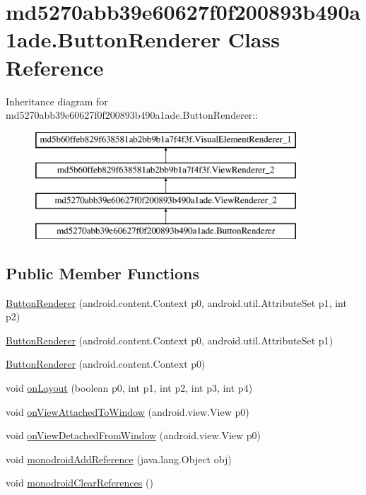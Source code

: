 \hypertarget{classmd5270abb39e60627f0f200893b490a1ade_1_1_button_renderer}{
\section{md5270abb39e60627f0f200893b490a1ade.ButtonRenderer Class Reference}
\label{classmd5270abb39e60627f0f200893b490a1ade_1_1_button_renderer}
}
Inheritance diagram for md5270abb39e60627f0f200893b490a1ade.ButtonRenderer::\begin{figure}[H]
\begin{center}
\leavevmode
\includegraphics[height=4cm]{classmd5270abb39e60627f0f200893b490a1ade_1_1_button_renderer}
\end{center}
\end{figure}
\subsection*{Public Member Functions}
\begin{CompactItemize}
\item 
\hyperlink{classmd5270abb39e60627f0f200893b490a1ade_1_1_button_renderer_69de53fe1b8c1bd7f640db6eef322fdd}{ButtonRenderer} (android.content.Context p0, android.util.AttributeSet p1, int p2)
\item 
\hyperlink{classmd5270abb39e60627f0f200893b490a1ade_1_1_button_renderer_032b2a49be9b19da3e846d539da04e80}{ButtonRenderer} (android.content.Context p0, android.util.AttributeSet p1)
\item 
\hyperlink{classmd5270abb39e60627f0f200893b490a1ade_1_1_button_renderer_ca79f33076eb791b82fb74d4075b5805}{ButtonRenderer} (android.content.Context p0)
\item 
void \hyperlink{classmd5270abb39e60627f0f200893b490a1ade_1_1_button_renderer_f2e3875cd2b7a03f7278f91e55939532}{onLayout} (boolean p0, int p1, int p2, int p3, int p4)
\item 
void \hyperlink{classmd5270abb39e60627f0f200893b490a1ade_1_1_button_renderer_096ced78b676353ccc21296f8eb579a3}{onViewAttachedToWindow} (android.view.View p0)
\item 
void \hyperlink{classmd5270abb39e60627f0f200893b490a1ade_1_1_button_renderer_197f3e7692578540f0931faffb7d50d0}{onViewDetachedFromWindow} (android.view.View p0)
\item 
void \hyperlink{classmd5270abb39e60627f0f200893b490a1ade_1_1_button_renderer_777673af96186211dacdc043e03e29c4}{monodroidAddReference} (java.lang.Object obj)
\item 
void \hyperlink{classmd5270abb39e60627f0f200893b490a1ade_1_1_button_renderer_85b560fcbb7fbef8f3ec48b9bf724210}{monodroidClearReferences} ()
\end{CompactItemize}
